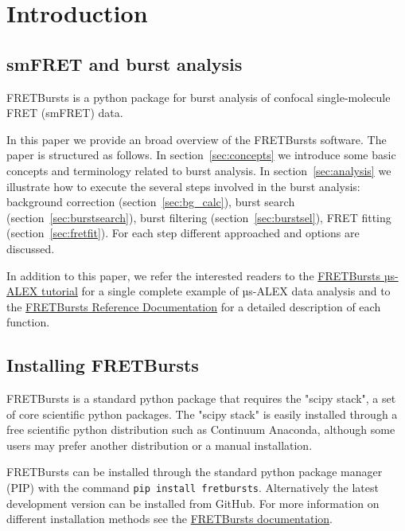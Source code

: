 \section{Introduction}

\subsection{smFRET and burst analysis}

FRETBursts is a python package for burst analysis of confocal single-molecule
FRET (smFRET) data.

In this paper we provide an broad overview of the FRETBursts software. The 
paper is structured as follows. In section~\ref{sec:concepts} we
introduce some basic concepts and terminology related to burst analysis.
In section~\ref{sec:analysis} we illustrate how to execute the several steps involved
in the burst analysis: background correction (section~\ref{sec:bg_calc}), burst search
(section~\ref{sec:burstsearch}), burst filtering (section~\ref{sec:burstsel}), 
FRET fitting (section~\ref{sec:fretfit}). For each step different approached and options are
discussed.

In addition to this paper, we refer the interested readers to the 
\href{http://nbviewer.ipython.org/github/tritemio/FRETBursts_notebooks/blob/master/notebooks/FRETBursts\%20-\%20us-ALEX\%20smFRET\%20burst\%20analysis.ipynb}{FRETBursts µs-ALEX tutorial} 
for a single complete example of µs-ALEX data analysis and to the
\href{http://fretbursts.readthedocs.org/}{FRETBursts Reference Documentation}
for a detailed description of each function.

\subsection{Installing FRETBursts}
FRETBursts is a standard python package that requires the "scipy stack", a set
of core scientific python packages.
The "scipy stack" is easily installed through a free scientific python
distribution such as Continuum Anaconda, although some users may prefer another
distribution or a manual installation.

FRETBursts can be installed through the standard python package manager (PIP)
with 
the command \texttt{pip install fretbursts}. Alternatively the latest
development version can be installed from GitHub.
For more information on different installation methods see the
\href{http://fretbursts.readthedocs.org/en/latest/installation.html}{FRETBursts
documentation}.

